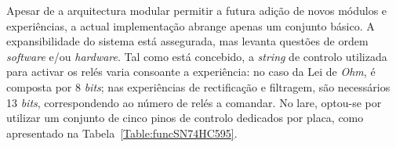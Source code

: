 Apesar de a arquitectura modular permitir a futura adição de novos módulos e experiências, a actual implementação abrange apenas um conjunto básico. A expansibilidade do sistema está assegurada, mas levanta questões de ordem \textit{software} e/ou \textit{hardware}. Tal como está concebido, a \textit{string} de controlo utilizada para activar os relés varia consoante a experiência: no caso da Lei de \textit{Ohm}, é composta por 8 \textit{bits}; nas experiências de rectificação e filtragem, são necessários 13 \textit{bits}, correspondendo ao número de relés a comandar. No \acrshort{lare}, optou-se por utilizar um conjunto de cinco pinos de controlo dedicados por placa, como apresentado na Tabela~\ref{Table:funcSN74HC595}.